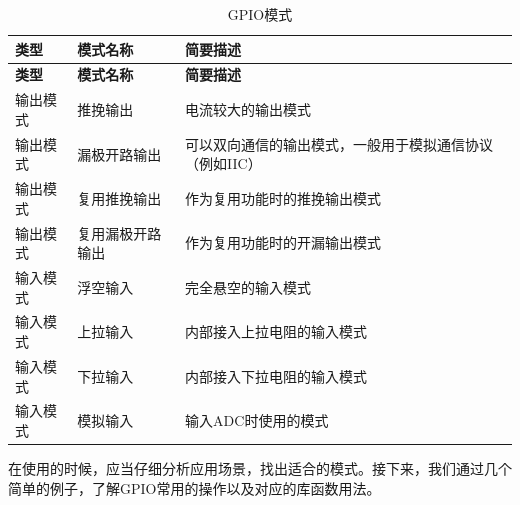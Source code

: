 \begin{center}
	\begin{longtable}[l]{| p{30mm} | p{40mm} | p{70mm} |}
		\caption{GPIO模式}\\
		\hline 
		\rowcolor{Gray}
		\textbf{类型} & \textbf{模式名称} & \textbf{简要描述} \\
		\hline
		\endfirsthead
		
		\hline 
		\rowcolor{Gray}
		\textbf{类型} & \textbf{模式名称} & \textbf{简要描述} \\
		\hline
		\endhead
		
		输出模式 & 推挽输出  & 电流较大的输出模式 \\
		输出模式 & 漏极开路输出 & 可以双向通信的输出模式，一般用于模拟通信协议（例如IIC） \\
		输出模式 & 复用推挽输出 & 作为复用功能时的推挽输出模式 \\
		输出模式 & 复用漏极开路输出 & 作为复用功能时的开漏输出模式 \\
		输入模式 & 浮空输入  & 完全悬空的输入模式 \\
		输入模式 & 上拉输入  & 内部接入上拉电阻的输入模式 \\
		输入模式 & 下拉输入  & 内部接入下拉电阻的输入模式 \\
		输入模式 & 模拟输入  & 输入ADC时使用的模式 \\
		
		\hline
	\end{longtable}
\end{center}
\par 
在使用的时候，应当仔细分析应用场景，找出适合的模式。接下来，我们通过几个简单的例子，了解GPIO常用的操作以及对应的库函数用法。
